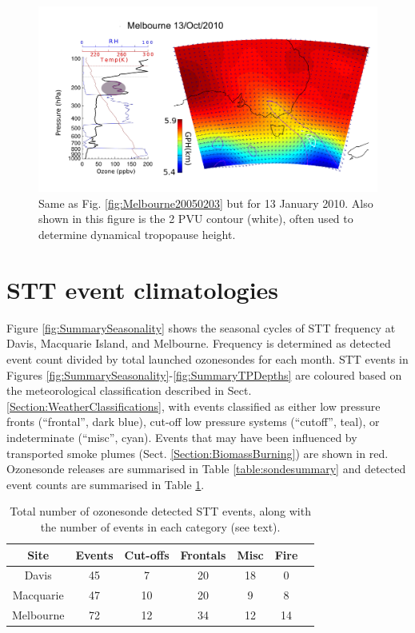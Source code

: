 \documentclass[acp, manuscript]{copernicus} %
\begin{document}
    \begin{figure}[t]
      \includegraphics[width=14.0cm]{figures/Melbourne20100113.png}
      \caption{Same as Fig. \ref{fig:Melbourne20050203} but for 13 January 2010.
	Also shown in this figure is the 2 PVU contour (white), often used to determine dynamical tropopause height.}
      \label{fig:Melbourne20100113}
    \end{figure}

\section{STT event climatologies}
  \label{sec:eventclimatologies}
  Figure \ref{fig:SummarySeasonality} shows the seasonal cycles of STT frequency at Davis, Macquarie Island, and Melbourne.
  Frequency is determined as detected event count divided by total launched ozonesondes for each month.
  STT events in Figures \ref{fig:SummarySeasonality}-\ref{fig:SummaryTPDepths} are coloured based on the meteorological classification described in Sect. \ref{Section:WeatherClassifications}, with events classified as either low pressure fronts (“frontal”, dark blue), cut-off low pressure systems (“cutoff”, teal), or indeterminate (“misc”, cyan).
  Events that may have been influenced by transported smoke plumes (Sect. \ref{Section:BiomassBurning}) are shown in red.
  Ozonesonde releases are summarised in Table \ref{table:sondesummary} and detected event counts are summarised in Table \ref{table:EventCounts}.
  \begin{table}[t]
    \caption{Total number of ozonesonde detected STT events, along with the number of events in each category (see text).}
    \begin{tabular}{ c   c   c   c   c   c   c } 
      \hline
      Site & Events & Cut-offs & Frontals & Misc & Fire \\
      \hline
      Davis     & 45 & 7  & 20 & 18 & 0 \\ 
      Macquarie & 47 & 10 & 20 & 9  & 8 \\
      Melbourne & 72 & 12 & 34 & 12 & 14 \\
      \hline
    \end{tabular}
    \label{table:EventCounts}
  \end{table}
\end{document}
